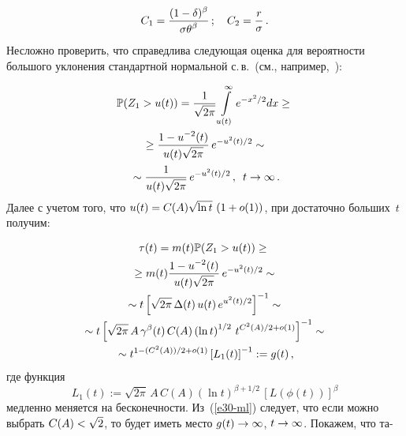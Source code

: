 \begin{multicols}{2}
\noindent
\begin{equation}
C_1=\displaystyle\frac{\displaystyle (1-\delta)^\beta\mathstrut}{\displaystyle \sigma{\theta}^\beta\mathstrut}\,;\quad C_2=\displaystyle\frac{\displaystyle r\mathstrut}{\displaystyle \sigma\mathstrut}\,.
\label{e29a-ml}
\end{equation}
Несложно проверить, что справедлива следующая оценка для вероятности
большого уклонения стандартной нормальной с.\,в.\ (см., например,~\cite{Lifshits}):

\noindent
\begin{multline*}
\mathbb{P} (Z_1 > u(t))=\displaystyle\frac{\displaystyle 1\mathstrut}{\displaystyle \sqrt{2\pi}\mathstrut}\int\limits_{u(t)}^\infty
e^{-x^2/2}dx\geq{}\\
{}\geq \displaystyle\frac{\displaystyle 1-u^{-2}(t)\mathstrut}{\displaystyle u(t)\sqrt{2\pi}\mathstrut}\,e^{-u^2(t)/2}\sim{}\\
{}\sim
\displaystyle\frac{\displaystyle 1\mathstrut}{\displaystyle u(t)\sqrt{2\pi}\mathstrut}\,e^{-u^2(t)/2}\,,\enskip t \to \infty\,.
\end{multline*}
Далее с учетом того, что $u(t) \hm= C(A) \sqrt{\ln t}\,\left(1+o(1)\right)$,
при достаточно больших~$t$ получим:

\noindent
\begin{multline}
\tau(t)=m(t)\mathbb{P}(Z_1>u(t))\geq{}\\
{}\geq m(t)\displaystyle\frac{\displaystyle 1-u^{-2}(t)\mathstrut}{\displaystyle u(t)\sqrt{2\pi}\mathstrut}\,e^{-u^2(t)/2}\sim{}\\
{}\sim t\left[\sqrt{2\pi}\,\Delta(t)\,u(t)\,e^{u^2(t)/2}\right]^{-1}\sim{}\\
{}\sim t \left[\sqrt{2\pi}\,A\,\gamma^\beta(t) \, C(A)\left(\ln t\right)^{1/2}\, t^{C^2(A)/2+o(1)}\right]^{-1}\sim{}\\
{}\sim t^{1-({C^2(A)})/{2}+o(1)}\left[L_1(t)\right]^{-1}:=g(t)\,,\label{e30-ml}
\end{multline}
где функция
$$
L_1(t):=\sqrt{2\pi}\,A\, C(A)(\ln t)^{\beta+1/2}\,[L(\phi(t))]^\beta
$$  
медленно меняется на бесконечности. Из~(\ref{e30-ml}) следует, что  если можно выбрать
$C(A)\hm<\sqrt{2}$, то будет иметь место  $g(t)\hm\to \infty$, $t\hm\to \infty$. 
Покажем, что та-\linebreak\vspace*{-12pt}

\pagebreak


\end{multicols}

